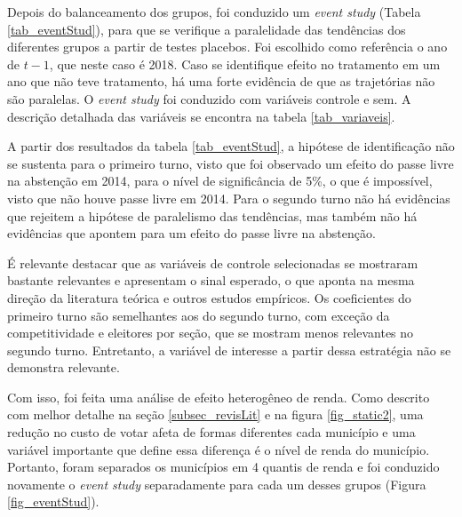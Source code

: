 Depois do balanceamento dos grupos, foi conduzido um \textit{event study} (Tabela \ref{tab_eventStud}), para que se verifique a paralelidade das tendências dos diferentes grupos a partir de testes placebos. Foi escolhido como referência o ano de $t-1$, que neste caso é 2018. Caso se identifique efeito no tratamento em um ano que não teve tratamento, há uma forte evidência de que as trajetórias não são paralelas. O \textit{event study} foi conduzido com variáveis controle e sem. A descrição detalhada das variáveis se encontra na tabela \ref{tab_variaveis}.

A partir dos resultados da tabela \ref{tab_eventStud}, a hipótese de identificação não se sustenta para o primeiro turno, visto que foi observado um efeito do passe livre na abstenção em 2014, para o nível de significância de 5\%, o que é impossível, visto que não houve passe livre em 2014. Para o segundo turno não há evidências que rejeitem a hipótese de paralelismo das tendências, mas também não há evidências que apontem para um efeito do passe livre na abstenção.



É relevante destacar que as variáveis de controle selecionadas se mostraram bastante relevantes e apresentam o sinal esperado, o que aponta na mesma direção da literatura teórica e outros estudos empíricos. Os coeficientes do primeiro turno são semelhantes aos do segundo turno, com exceção da competitividade e eleitores por seção, que se mostram menos relevantes no segundo turno. Entretanto, a variável de interesse a partir dessa estratégia não se demonstra relevante.

Com isso, foi feita uma análise de efeito heterogêneo de renda. Como descrito com melhor detalhe na seção \ref{subsec_revisLit} e na figura \ref{fig_static2}, uma redução no custo de votar afeta de formas diferentes cada município e uma variável importante que define essa diferença é o nível de renda do município. Portanto, foram separados os municípios em 4 quantis de renda e foi conduzido novamente o \textit{event study} separadamente para cada um desses grupos (Figura \ref{fig_eventStud}). 

